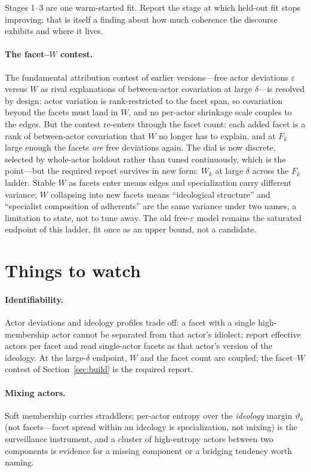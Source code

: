 \documentclass[11pt]{article}
\newcommand{\1}{\mathbb{1}}
\begin{document}
Stages 1--3 are one warm-started fit. Report the stage at which held-out fit stops improving; that is itself a finding about how much coherence the discourse exhibits and where it lives.

\paragraph{The facet--$W$ contest.} The fundamental attribution contest of earlier versions---free actor deviations $\varepsilon$ versus $W$ as rival explanations of between-actor covariation at large $\delta$---is resolved by design: actor variation is rank-restricted to the facet span, so covariation beyond the facets must land in $W$, and no per-actor shrinkage scale couples to the edges. But the contest re-enters through the facet count: each added facet is a rank of between-actor covariation that $W$ no longer has to explain, and at $F_k$ large enough the facets \emph{are} free deviations again. The dial is now discrete, selected by whole-actor holdout rather than tuned continuously, which is the point---but the required report survives in new form: $W_k$ at large $\delta$ across the $F_k$ ladder. Stable $W$ as facets enter means edges and specialization carry different variance; $W$ collapsing into new facets means ``ideological structure'' and ``specialist composition of adherents'' are the same variance under two names, a limitation to state, not to tune away. The old free-$\varepsilon$ model remains the saturated endpoint of this ladder, fit once as an upper bound, not a candidate.

\section{Things to watch}\label{sec:watch}

\paragraph{Identifiability.} Actor deviations and ideology profiles trade off: a facet with a single high-membership actor cannot be separated from that actor's idiolect; report effective actors per facet and read single-actor facets as that actor's version of the ideology. At the large-$\delta$ endpoint, $W$ and the facet count are coupled; the facet--$W$ contest of Section~\ref{sec:build} is the required report.

\paragraph{Mixing actors.} Soft membership carries straddlers; per-actor entropy over the \emph{ideology} margin $\vartheta_a$ (not facets---facet spread within an ideology is specialization, not mixing) is the surveillance instrument, and a cluster of high-entropy actors between two components is evidence for a missing component or a bridging tendency worth naming.
\end{document}
